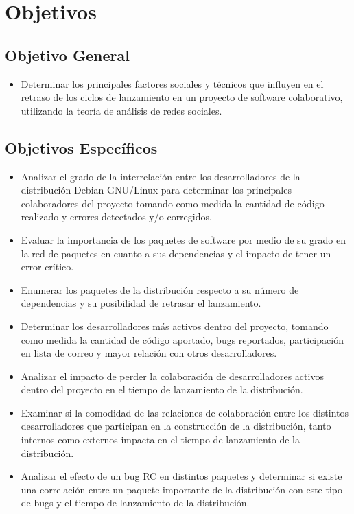 \documentclass[12pt,titlepage]{report}
\begin{document}
\chapter{Objetivos}
\section*{Objetivo General}
\begin{itemize}
\item Determinar los principales factores sociales y técnicos que
  influyen en el retraso de los ciclos de lanzamiento en un proyecto
  de software colaborativo, utilizando la teoría de análisis de redes
  sociales.
\end{itemize}

\section*{Objetivos Específicos}
\begin{itemize}
\item Analizar el grado de la interrelación entre los desarrolladores
  de la distribución Debian GNU/Linux para determinar los principales
  colaboradores del proyecto tomando como medida la cantidad de código
  realizado y errores detectados y/o corregidos.
\item Evaluar la importancia de los paquetes de software por medio de
  su grado en la red de paquetes en cuanto a sus dependencias y el
  impacto de tener un error crítico.
\item Enumerar los paquetes de la distribución respecto a su número de
  dependencias y su posibilidad de retrasar el lanzamiento.
\item Determinar los desarrolladores más activos dentro del proyecto,
  tomando como medida la cantidad de código aportado, bugs reportados,
  participación en lista de correo y mayor relación con otros
  desarrolladores.
\item Analizar el impacto de perder la colaboración de desarrolladores
  activos dentro del proyecto en el tiempo de lanzamiento de la
  distribución.
\item Examinar si la comodidad de las relaciones de colaboración entre
  los distintos desarrolladores que participan en la construcción de
  la distribución, tanto internos como externos impacta en el tiempo
  de lanzamiento de la distribución.
\item Analizar el efecto de un bug RC en distintos paquetes y
  determinar si existe una correlación entre un paquete importante de
  la distribución con este tipo de bugs y el tiempo de lanzamiento de
  la distribución.
\end{itemize}
\end{document}
